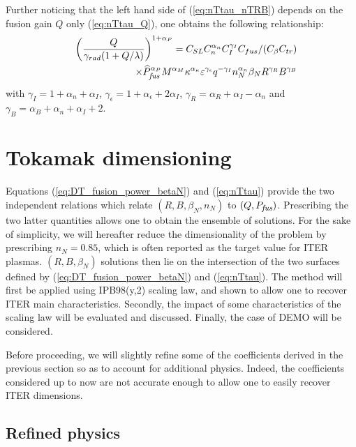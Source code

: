 \documentclass[12pt]{iopart}
\newcommand{\Pfus}{{P_{\textrm{\it\footnotesize fus}}}}
\newcommand{\hatPfus}{{\widehat{P}_{\textrm{\it\footnotesize fus}}}}
\newcommand{\newstuff}[1]{\color{blue}{#1}\color{black}}
\begin{document}
Further noticing that the left hand side of (\ref{eq:nTtau_nTRB}) depends on the fusion gain $Q$ only (\ref{eq:nTtau_Q}), one obtains the following relationship:
\begin{eqnarray}
&& \left( \frac{Q}{\gamma_{rad}(1+Q/\lambda)} \right)^{1+\alpha_P} =
	C_{SL} C_n^{\alpha_n} C_I^{\gamma_I}  
	C_{fus}/(C_\beta C_{tr})
	  \nonumber \\
	&&\;\;\;\;\;\;\;\;\;\;\; \times 
	\hatPfus^{\alpha_P} M^{\alpha_M} 
	\kappa^{\alpha_\kappa} \varepsilon^{\gamma_\epsilon} q^{-\gamma_I} 
	n_N^{\alpha_n} \beta_N R^{\gamma_R} B^{\gamma_B}
	\label{eq:nTtau}
\end{eqnarray}
with 
$\gamma_I = 1+ \alpha_n+\alpha_I$, $\gamma_\epsilon = 1+ \alpha_\epsilon + 2\alpha_I$, $\gamma_R = \alpha_R +\alpha_I -\alpha_n$ and $\gamma_B = \alpha_B+\alpha_n+\alpha_I +2$.


\section{Tokamak \newstuff{reactor } dimensioning} \label{sec:Tokamak_dimensioning}

Equations (\ref{eq:DT_fusion_power_betaN}) and (\ref{eq:nTtau}) provide the two independent relations which relate $(R,B,\beta_N,n_N)$ to $(Q, \Pfus)$. Prescribing the two latter quantities allows one to obtain the ensemble of solutions. For the sake of simplicity, we will hereafter reduce the dimensionality of the problem by prescribing $n_N=0.85$, which is often reported as the target value for ITER plasmas. $(R,B,\beta_N)$ solutions then lie on the intersection of the two surfaces defined by (\ref{eq:DT_fusion_power_betaN}) and (\ref{eq:nTtau}).
The method will first be applied using IPB98(y,2) scaling law, and shown to allow one to recover ITER main characteristics. Secondly, the impact of some characteristics of the scaling law will be evaluated and discussed. Finally, the case of DEMO will be considered.

Before proceeding, we will slightly refine some of the coefficients derived in the previous section so as to account for additional physics. Indeed, the coefficients considered up to now are not accurate enough to allow one to easily recover ITER dimensions.

\subsection{Refined physics} \label{subsec:refined_coefs}
\end{document}
